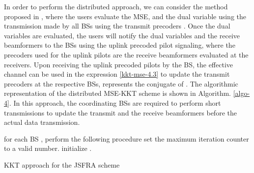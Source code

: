 In order to perform the distributed approach, we can consider the method proposed in \cite{komulainen2013effective}, where the users evaluate the \ac{MSE}, and the dual variable  using the transmission made by all \acp{BS} using the transmit precoders . Once the dual variables are evaluated, the users will notify the dual variables and the receive beamformers to the \acp{BS} using the uplink precoded pilot signaling, where the precoders used for the uplink pilots are the receive beamformers  evaluated at the receivers. Upon receiving the uplink precoded pilots by the \ac{BS}, the effective channel  can be used in the expression \eqref{kkt-mse-4.3} to update the transmit precoders at the respective \acp{BS},  represents the conjugate of . The algorithmic representation of the distributed \ac{MSE}-\ac{KKT} scheme is shown in Algorithm. \ref{algo-4}. In this approach, the coordinating \acp{BS} are required to perform short transmissions to update the transmit and the receive beamformers before the actual data transmission.
\begin{algorithm}
 \SetAlgoLined
 \DontPrintSemicolon
 \BlankLine
 for each \ac{BS} , perform the following procedure \;
 set the maximum iteration counter  to a valid number. \;
 initialize . \;
 \caption{\ac{KKT} approach for the \ac{JSFRA} scheme}
 \label{algo-4}
\end{algorithm}

